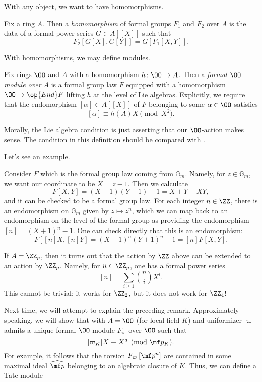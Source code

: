 \documentclass[../notes.tex]{subfiles}
\begin{document}
With any object, we want to have homomorphisms.
\begin{defihelper}[homomorphism] 
	Fix a ring $A$. Then a \textit{homomorphism} of formal groups $F_1$ and $F_2$ over $A$ is the data of a formal power series $G\in A[[X]]$ such that
	\[F_2[G[X],G[Y]]=G[F_1[X,Y]].\]
\end{defihelper}
With homomorphisms, we may define modules.
\begin{definition}
	Fix rings $\OO$ and $A$ with a homomorphism $h\colon\OO\to A$. Then a \textit{formal $\OO$-module over $A$} is a formal group law $F$ equipped with a homomorphism $\OO\to\op{End}F$ lifting $h$ at the level of Lie algebras. Explicitly, we require that the endomorphism $[\alpha]\in A[[X]]$ of $F$ belonging to some $\alpha\in\OO$ satisfies
	\[[\alpha]\equiv h(A)X\pmod{X^2}.\]
\end{definition}
\begin{remark}
	Morally, the Lie algebra condition is just asserting that our $\OO$-action makes sense. The condition in this definition should be compared with .
\end{remark}
Let's see an example.
\begin{example}
	Consider $F$ which is the formal group law coming from $\mathbb G_m$. Namely, for $z\in\mathbb G_m$, we want our coordinate to be $X=z-1$. Then we calculate
	\[F[X,Y]=(X+1)(Y+1)-1=X+Y+XY,\]
	and it can be checked to be a formal group law. For each integer $n\in\ZZ$, there is an endomorphism on $\mathbb G_m$ given by $z\mapsto z^n$, which we can map back to an endomorphism on the level of the formal group as providing the endomorphism $[n]=(X+1)^n-1$. One can check directly that this is an endomorphism:
	\[F[[n]X,[n]Y]=(X+1)^n(Y+1)^n-1=[n]F[X,Y].\]
\end{example}
\begin{remark}
	If $A=\ZZ_p$, then it turns out that the action by $\ZZ$ above can be extended to an action by $\ZZ_p$. Namely, for $n\in\ZZ_p$, one has a formal power series
	\[[n]=\sum_{i\ge1}\binom niX^i.\]
	This cannot be trivial: it works for $\ZZ_2$, but it does not work for $\ZZ_4$!
\end{remark}
Next time, we will attempt to explain the preceding remark. Approximately speaking, we will show that with $A=\OO$ (for local field $K$) and uniformizer $\varpi$ admits a unique formal $\OO$-module $F_\varpi$ over $\OO$ such that
\[[\varpi_K]X\equiv X^q\pmod{\mf p_K}.\]
For example, it follows that the torsion $F_\varpi\left[\mf p^n\right]$ are contained in some maximal ideal $\widehat{\mf p}$ belonging to an algebraic closure of $K$. Thus, we can define a Tate module
\end{document}
